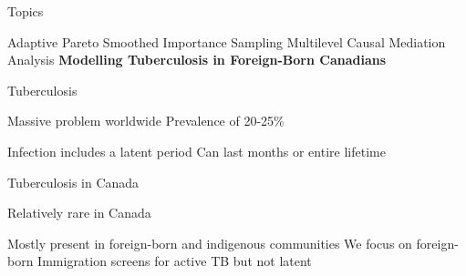 \documentclass[14pt]{beamer}
\begin{document}
    












\begin{frame}{Topics}
    \begin{outline}
        \1 Adaptive Pareto Smoothed Importance Sampling \newline
        \1 Multilevel Causal Mediation Analysis \newline
        \1 \textbf{Modelling Tuberculosis in Foreign-Born Canadians}
    \end{outline}
\end{frame}



\begin{frame}{Tuberculosis}
    \begin{outline}
        \1 Massive problem worldwide
            \2 Prevalence of 20-25\%
            \2 \citep{Coh19} \newline
        
        \1 Infection includes a latent period
            \2 Can last months or entire lifetime
    \end{outline}
\end{frame}

\begin{frame}{Tuberculosis in Canada}
    \begin{outline}
        \1 Relatively rare in Canada \newline

        \1 Mostly present in foreign-born and indigenous communities
            \2 We focus on foreign-born
        \1 Immigration screens for active TB but not latent
    \end{outline}
\end{frame}
\end{document}
